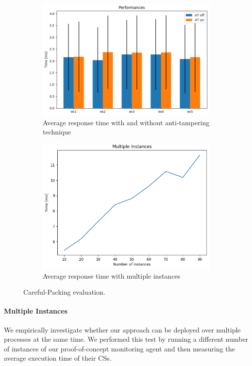 \begin{figure}[t]
	\centering
	\begin{subfigure}[t]{0.45\textwidth}
		\includegraphics[width=\linewidth]{fig_c3/performanceEvaluation}
		\caption{Average response time with and without anti-tampering 
		technique}
		\label{fig:performanceEvaluation}
	\end{subfigure}
	\hfill
	\begin{subfigure}[t]{0.45\textwidth}
		\includegraphics[width=\linewidth]{fig_c3/multiple}
		\caption{Average response time with multiple instances}
		\label{fig:multiple}
	\end{subfigure}
	\caption{Careful-Packing evaluation.}
	\label{fig:performance2}
\end{figure}

\paragraph{\textbf{Multiple Instances}}
We empirically investigate whether our approach can be deployed over multiple 
processes at the same time.
We performed this test by running a different number of instances of our 
proof-of-concept monitoring agent and then measuring the average execution time 
of their CSs.

